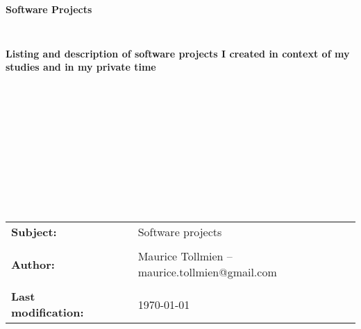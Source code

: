\documentclass[a4paper, 12pt]{article}
\begin{document}
	
\thispagestyle{empty}



\begin{verbatim}





\end{verbatim}

\begin{center}
\textbf{\LARGE{Software Projects}}
\end{center}

\begin{verbatim}


\end{verbatim}

\begin{center}
\textbf{\large{Listing and description of software projects I created in context of my studies and in my private time}}
\end{center}

\begin{verbatim}












\end{verbatim}

\begin{flushleft}
\begin{tabular}{llll}

\textbf{Subject:}
& & & Software projects
\\
\\
\textbf{Author:}
& & & Maurice Tollmien -- maurice.tollmien@gmail.com
\\
\\
\textbf{Last modification:}
& & & \today



\end{tabular}
\end{flushleft}


\newpage


\tableofcontents
\newpage

\end{document}
